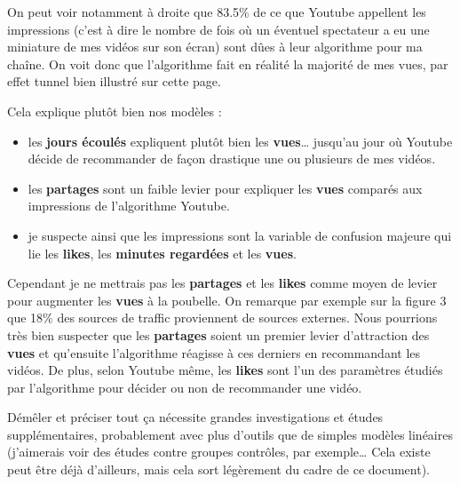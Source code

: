 On peut voir notamment à droite que 83.5\% de ce que Youtube appellent
les impressions (c'est à dire le nombre de fois où un éventuel
spectateur a eu une miniature de mes vidéos sur son écran) sont dûes à
leur algorithme pour ma chaîne. On voit donc que l'algorithme fait en
réalité la majorité de mes vues, par effet tunnel bien illustré sur
cette page.

Cela explique plutôt bien nos modèles :

\begin{itemize}
\tightlist
\item
  les \textbf{jours écoulés} expliquent plutôt bien les
  \textbf{vues}\ldots{} jusqu'au jour où Youtube décide de recommander
  de façon drastique une ou plusieurs de mes vidéos.
\item
  les \textbf{partages} sont un faible levier pour expliquer les
  \textbf{vues} comparés aux impressions de l'algorithme Youtube.
\item
  je suspecte ainsi que les impressions sont la variable de confusion
  majeure qui lie les \textbf{likes}, les \textbf{minutes regardées} et
  les \textbf{vues}.
\end{itemize}

Cependant je ne mettrais pas les \textbf{partages} et les \textbf{likes}
comme moyen de levier pour augmenter les \textbf{vues} à la poubelle. On
remarque par exemple sur la figure 3 que 18\% des sources de traffic
proviennent de sources externes. Nous pourrions très bien suspecter que
les \textbf{partages} soient un premier levier d'attraction des
\textbf{vues} et qu'ensuite l'algorithme réagisse à ces derniers en
recommandant les vidéos. De plus, selon Youtube même, les \textbf{likes}
sont l'un des paramètres étudiés par l'algorithme pour décider ou non de
recommander une vidéo.

Démêler et préciser tout ça nécessite grandes investigations et études
supplémentaires, probablement avec plus d'outils que de simples modèles
linéaires (j'aimerais voir des études contre groupes contrôles, par
exemple\ldots{} Cela existe peut être déjà d'ailleurs, mais cela sort
légèrement du cadre de ce document).

